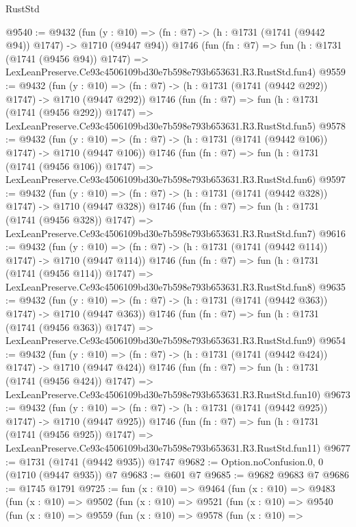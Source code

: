 \begin{lexlean}{RustStd}
\begin{coremodule}
@9540 := @9432
    (fun (y : @10) => (fn : @7) -> (h : @1731 (@1741 (@9442 @94)) @1747) -> @1710 (@9447 @94))
    @1746
    (fun (fn : @7) =>
    fun (h : @1731 (@1741 (@9456 @94)) @1747) =>
    LexLeanPreserve.Ce93c4506109bd30e7b598e793b653631.R3.RustStd.fun4)
@9559 := @9432
    (fun (y : @10) => (fn : @7) -> (h : @1731 (@1741 (@9442 @292)) @1747) -> @1710 (@9447 @292))
    @1746
    (fun (fn : @7) =>
    fun (h : @1731 (@1741 (@9456 @292)) @1747) =>
    LexLeanPreserve.Ce93c4506109bd30e7b598e793b653631.R3.RustStd.fun5)
@9578 := @9432
    (fun (y : @10) => (fn : @7) -> (h : @1731 (@1741 (@9442 @106)) @1747) -> @1710 (@9447 @106))
    @1746
    (fun (fn : @7) =>
    fun (h : @1731 (@1741 (@9456 @106)) @1747) =>
    LexLeanPreserve.Ce93c4506109bd30e7b598e793b653631.R3.RustStd.fun6)
@9597 := @9432
    (fun (y : @10) => (fn : @7) -> (h : @1731 (@1741 (@9442 @328)) @1747) -> @1710 (@9447 @328))
    @1746
    (fun (fn : @7) =>
    fun (h : @1731 (@1741 (@9456 @328)) @1747) =>
    LexLeanPreserve.Ce93c4506109bd30e7b598e793b653631.R3.RustStd.fun7)
@9616 := @9432
    (fun (y : @10) => (fn : @7) -> (h : @1731 (@1741 (@9442 @114)) @1747) -> @1710 (@9447 @114))
    @1746
    (fun (fn : @7) =>
    fun (h : @1731 (@1741 (@9456 @114)) @1747) =>
    LexLeanPreserve.Ce93c4506109bd30e7b598e793b653631.R3.RustStd.fun8)
@9635 := @9432
    (fun (y : @10) => (fn : @7) -> (h : @1731 (@1741 (@9442 @363)) @1747) -> @1710 (@9447 @363))
    @1746
    (fun (fn : @7) =>
    fun (h : @1731 (@1741 (@9456 @363)) @1747) =>
    LexLeanPreserve.Ce93c4506109bd30e7b598e793b653631.R3.RustStd.fun9)
@9654 := @9432
    (fun (y : @10) => (fn : @7) -> (h : @1731 (@1741 (@9442 @424)) @1747) -> @1710 (@9447 @424))
    @1746
    (fun (fn : @7) =>
    fun (h : @1731 (@1741 (@9456 @424)) @1747) =>
    LexLeanPreserve.Ce93c4506109bd30e7b598e793b653631.R3.RustStd.fun10)
@9673 := @9432
    (fun (y : @10) => (fn : @7) -> (h : @1731 (@1741 (@9442 @925)) @1747) -> @1710 (@9447 @925))
    @1746
    (fun (fn : @7) =>
    fun (h : @1731 (@1741 (@9456 @925)) @1747) =>
    LexLeanPreserve.Ce93c4506109bd30e7b598e793b653631.R3.RustStd.fun11)
@9677 := @1731 (@1741 (@9442 @935)) @1747
@9682 := Option.noConfusion.{0, 0} (@1710 (@9447 @935)) @7
@9683 := @601 @7
@9685 := @9682 @9683 @7
@9686 := @1745 @1791
@9725 := fun (x : @10) =>
  @9464
    (fun (x : @10) =>
    @9483
      (fun (x : @10) =>
      @9502
        (fun (x : @10) =>
        @9521
          (fun (x : @10) =>
          @9540
            (fun (x : @10) =>
            @9559
              (fun (x : @10) =>
              @9578
                (fun (x : @10) =>

\end{coremodule}
\end{lexlean}
